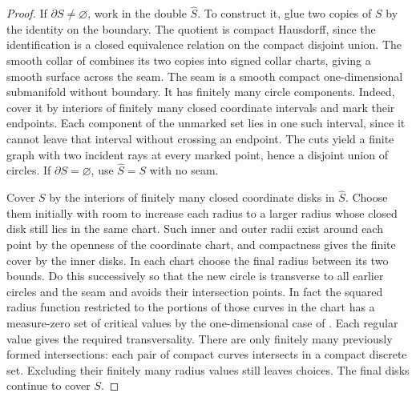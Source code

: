 \documentclass[11pt,oneside,openany]{book}
\theoremstyle{plain}
\theoremstyle{definition}
\theoremstyle{remark}
\begin{document}
\begin{proof}
If \(\partial S\ne\varnothing\), work in the double \(\widehat S\).
To construct it, glue two copies of \(S\) by the identity on the
boundary. The quotient is compact Hausdorff, since the identification
is a closed equivalence relation on the compact disjoint union.
The smooth collar of \cite[Theorem 6.5]{P104} combines its two
copies into signed collar charts, giving a smooth surface across
the seam. The seam is a smooth compact one-dimensional submanifold
without boundary. It has finitely many circle components. Indeed,
cover it by interiors of finitely many closed coordinate intervals
and mark their endpoints. Each component of the unmarked set
lies in one such interval, since it cannot leave that interval
without crossing an endpoint. The cuts yield a finite graph with
two incident rays at every marked point, hence a disjoint union
of circles.
If \(\partial S=\varnothing\), use \(\widehat S=S\) with no seam.

Cover \(S\) by the interiors of finitely many closed coordinate
disks in \(\widehat S\). Choose them initially with room to increase
each radius to a larger radius whose closed disk still lies in the
same chart. Such inner and outer radii exist around each point by
the openness of the coordinate chart, and compactness gives the
finite cover by the inner disks. In each chart choose the final
radius between its two bounds. Do this successively so that the
new circle is transverse to all earlier circles and the seam and
avoids their intersection points. In fact the squared radius
function restricted to the portions of those curves in the chart
has a measure-zero set of critical values by the one-dimensional
case of \cite[Theorem 4.1]{P104}. Each regular value gives the
required transversality. There are only finitely many previously
formed intersections: each pair of compact curves intersects in a
compact discrete set. Excluding their finitely many radius values
still leaves choices. The final disks continue to cover \(S\).


\end{proof}
\end{document}
